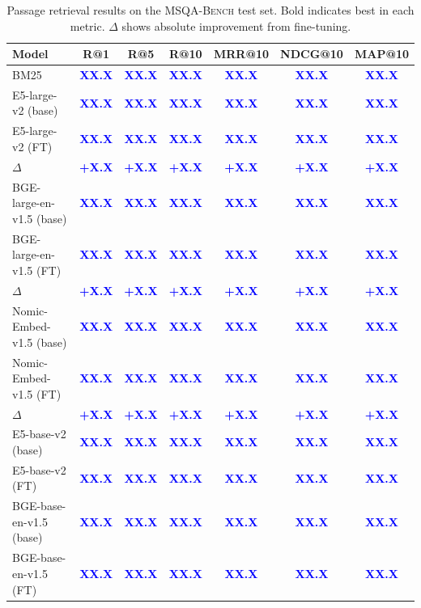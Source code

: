 \documentclass[11pt]{article}
\newcommand{\msqa}{\textsc{MSQA-Bench}}
\newcommand{\placeholder}[1]{\textcolor{blue}{\textbf{#1}}}
\begin{document}
\begin{table}[t]
\caption{Passage retrieval results on the \msqa{} test set. Bold indicates best in each metric. $\Delta$ shows absolute improvement from fine-tuning.}
\label{tab:retrieval}
\centering
\small
\begin{tabular}{lcccccc}
\toprule
\textbf{Model} & \textbf{R@1} & \textbf{R@5} & \textbf{R@10} & \textbf{MRR@10} & \textbf{NDCG@10} & \textbf{MAP@10} \\
\midrule
BM25 & \placeholder{XX.X} & \placeholder{XX.X} & \placeholder{XX.X} & \placeholder{XX.X} & \placeholder{XX.X} & \placeholder{XX.X} \\
\midrule
E5-large-v2 (base) & \placeholder{XX.X} & \placeholder{XX.X} & \placeholder{XX.X} & \placeholder{XX.X} & \placeholder{XX.X} & \placeholder{XX.X} \\
E5-large-v2 (FT) & \placeholder{XX.X} & \placeholder{XX.X} & \placeholder{XX.X} & \placeholder{XX.X} & \placeholder{XX.X} & \placeholder{XX.X} \\
\rowcolor{gray!10} $\Delta$ & \placeholder{+X.X} & \placeholder{+X.X} & \placeholder{+X.X} & \placeholder{+X.X} & \placeholder{+X.X} & \placeholder{+X.X} \\
\midrule
BGE-large-en-v1.5 (base) & \placeholder{XX.X} & \placeholder{XX.X} & \placeholder{XX.X} & \placeholder{XX.X} & \placeholder{XX.X} & \placeholder{XX.X} \\
BGE-large-en-v1.5 (FT) & \placeholder{XX.X} & \placeholder{XX.X} & \placeholder{XX.X} & \placeholder{XX.X} & \placeholder{XX.X} & \placeholder{XX.X} \\
\rowcolor{gray!10} $\Delta$ & \placeholder{+X.X} & \placeholder{+X.X} & \placeholder{+X.X} & \placeholder{+X.X} & \placeholder{+X.X} & \placeholder{+X.X} \\
\midrule
Nomic-Embed-v1.5 (base) & \placeholder{XX.X} & \placeholder{XX.X} & \placeholder{XX.X} & \placeholder{XX.X} & \placeholder{XX.X} & \placeholder{XX.X} \\
Nomic-Embed-v1.5 (FT) & \placeholder{XX.X} & \placeholder{XX.X} & \placeholder{XX.X} & \placeholder{XX.X} & \placeholder{XX.X} & \placeholder{XX.X} \\
\rowcolor{gray!10} $\Delta$ & \placeholder{+X.X} & \placeholder{+X.X} & \placeholder{+X.X} & \placeholder{+X.X} & \placeholder{+X.X} & \placeholder{+X.X} \\
\midrule
E5-base-v2 (base) & \placeholder{XX.X} & \placeholder{XX.X} & \placeholder{XX.X} & \placeholder{XX.X} & \placeholder{XX.X} & \placeholder{XX.X} \\
E5-base-v2 (FT) & \placeholder{XX.X} & \placeholder{XX.X} & \placeholder{XX.X} & \placeholder{XX.X} & \placeholder{XX.X} & \placeholder{XX.X} \\
\midrule
BGE-base-en-v1.5 (base) & \placeholder{XX.X} & \placeholder{XX.X} & \placeholder{XX.X} & \placeholder{XX.X} & \placeholder{XX.X} & \placeholder{XX.X} \\
BGE-base-en-v1.5 (FT) & \placeholder{XX.X} & \placeholder{XX.X} & \placeholder{XX.X} & \placeholder{XX.X} & \placeholder{XX.X} & \placeholder{XX.X} \\
\bottomrule
\end{tabular}
\end{table}
\end{document}
